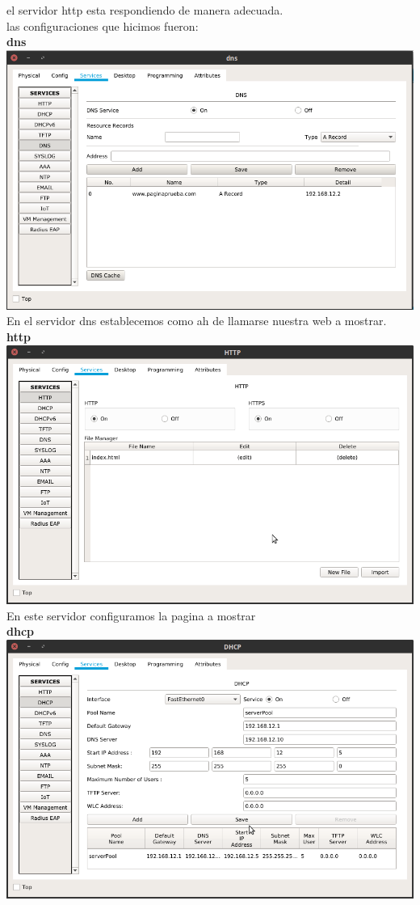 el servidor http esta respondiendo de manera adecuada.\\
las configuraciones que hicimos fueron:\\
\textbf{dns}\\
\includegraphics[scale=0.5]{img/dns.png} 
\\En el servidor dns establecemos como ah de llamarse nuestra web a mostrar.\\
\textbf{http}\\
\includegraphics[scale=0.5]{img/http.png}
\\En este servidor configuramos la pagina a mostrar\\
\textbf{dhcp}\\
\includegraphics[scale=0.5]{img/dhcp.png} 
